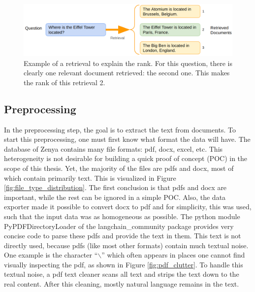 \begin{figure}[h]
	\centering
	\captionsetup{justification=centering}
	\includegraphics[width=0.9\linewidth]{fig/RAG_rank.png}
	\caption{Example of a retrieval to explain the rank. For this question, there is clearly one relevant document retrieved: the second one. This makes the rank of this retrieval 2.}
	\label{fig:rag_rank}
\end{figure}

\subsection{Preprocessing}
In the preprocessing step, the goal is to extract the text from documents. To start this preprocessing, one must first know what format the data will have. The database of Zenya contains many file formats: pdf, docx, excel, etc. This heterogeneity is not desirable for building a quick proof of concept (POC) in the scope of this thesis. Yet, the majority of the files are pdfs and docx, most of which contain primarily text. This is visualized in Figure \ref{fig:file_type_distribution}. The first conclusion is that pdfs and docx are important, while the rest can be ignored in a simple POC. Also, the data exporter made it possible to convert docx to pdf and for simplicity, this was used, such that the input data was as homogeneous as possible. The python module PyPDFDirectoryLoader of the langchain\_community package \cite{langchain2025pypdfdirectoryloader} provides very concise code to parse these pdfs and provide the text in them. This text is not directly used, because pdfs (like most other formats) contain much textual noise. One example is the character ``$\backslash$'' which often appears in places one cannot find visually inspecting the pdf, as shown in Figure \ref{fig:pdf_clutter}. To handle this textual noise, a pdf text cleaner scans all text and strips the text down to the real content. After this cleaning, mostly natural language remains in the text.

